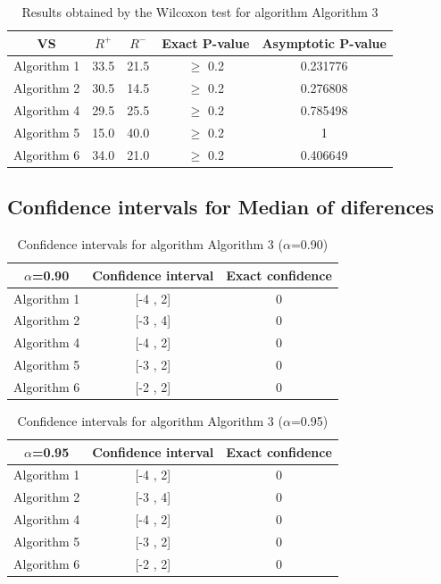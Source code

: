 \documentclass[a4paper,10pt]{article}
\begin{document}
\begin{table}[!htp]
\centering\small
\begin{tabular}{
|c|c|c|c|c|}
\hline
 VS & $R^{+}$ & $R^{-}$ & Exact P-value & Asymptotic P-value \\ \hline 
Algorithm 1 & 33.5 & 21.5 & $\geq$ 0.2 & 0.231776\\ \hline 
Algorithm 2 & 30.5 & 14.5 & $\geq$ 0.2 & 0.276808\\ \hline 
Algorithm 4 & 29.5 & 25.5 & $\geq$ 0.2 & 0.785498\\ \hline 
Algorithm 5 & 15.0 & 40.0 & $\geq$ 0.2 & 1\\ \hline 
Algorithm 6 & 34.0 & 21.0 & $\geq$ 0.2 & 0.406649\\ \hline 

\end{tabular}
\caption{Results obtained by the Wilcoxon test for algorithm Algorithm 3}
\end{table}

\subsection{Confidence intervals for Median of diferences}

\begin{table}[!htp]
\centering\small
\begin{tabular}{
|c|c|c|}
\hline
 $\alpha$=0.90 & Confidence interval & Exact confidence \\ \hline 
Algorithm 1 & [-4 , 2] & 0\\ \hline 
Algorithm 2 & [-3 , 4] & 0\\ \hline 
Algorithm 4 & [-4 , 2] & 0\\ \hline 
Algorithm 5 & [-3 , 2] & 0\\ \hline 
Algorithm 6 & [-2 , 2] & 0\\ \hline 

\end{tabular}
\caption{Confidence intervals for algorithm Algorithm 3 ($\alpha$=0.90)}
\end{table}
\begin{table}[!htp]
\centering\small
\begin{tabular}{
|c|c|c|}
\hline
 $\alpha$=0.95 & Confidence interval & Exact confidence \\ \hline 
Algorithm 1 & [-4 , 2] & 0\\ \hline 
Algorithm 2 & [-3 , 4] & 0\\ \hline 
Algorithm 4 & [-4 , 2] & 0\\ \hline 
Algorithm 5 & [-3 , 2] & 0\\ \hline 
Algorithm 6 & [-2 , 2] & 0\\ \hline 

\end{tabular}
\caption{Confidence intervals for algorithm Algorithm 3 ($\alpha$=0.95)}
\end{table}
\end{document}

